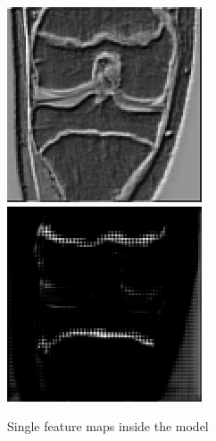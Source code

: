 \begin{figure}[H]
\endminipage\hfill
{}%
  \includegraphics[width=\linewidth]{imgs/channel2.png}
\endminipage\hfill
{}%
  \includegraphics[width=\linewidth]{imgs/channel4.png}
\endminipage
\caption{Single feature maps inside the model}
\end{figure}

